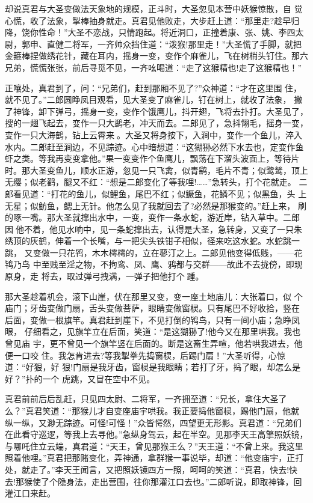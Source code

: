 却说真君与大圣变做法天象地的规模，正斗时，大圣忽见本营中妖猴惊散，自
觉心慌，收了法象，掣棒抽身就走。真君见他败走，大步赶上道：“那里走?趁早归
降，饶你性命！”大圣不恋战，只情跑起。将近洞口，正撞着康、张、姚、李四太
尉，郭申、直健二将军，一齐帅众挡住道：“泼猴!那里走！”大圣慌了手脚，就把
金箍棒捏做绣花针，藏在耳内，摇身一变，变作个麻雀儿，飞在树梢头钉住。那六
兄弟，慌慌张张，前后寻觅不见，一齐吆喝道：“走了这猴精也!走了这猴精也！”

正嚷处，真君到了，问：“兄弟们，赶到那厢不见了?”众神道：“才在这里围
住，就不见了。”二郎圆睁凤目观看，见大圣变了麻雀儿，钉在树上，就收了法象，
撇了神锋，卸下弹弓，摇身一变，变作个饿鹰儿，抖开翅，飞将去扑打。大圣见了，
搜的一翅飞起去，变作一只大鹚老，冲天而去。二郎见了，急抖翎毛，摇身一变，
变作一只大海鹤，钻上云霄来。大圣又将身按下，入涧中，变作一个鱼儿，淬入
水内。二郎赶至涧边，不见踪迹。心中暗想道：“这猢狲必然下水去也，定变作鱼
虾之类。等我再变变拿他。”果一变变作个鱼鹰儿，飘荡在下溜头波面上，等待片
时。那大圣变鱼儿，顺水正游，忽见一只飞禽，似青鹞，毛片不青；似鹭鸶，顶上
无缨；似老鹳，腿又不红：“想是二郎变化了等我哩!……”急转头，打个花就走。
二郎看见道：“打花的鱼儿，似鲤鱼，尾巴不红；似鳜鱼，花鳞不见；似黑鱼，头
上无星；似鲂鱼，鳃上无针。他怎么见了我就回去了?必然是那猴变的。”赶上来，
刷的啄一嘴。那大圣就撺出水中，一变，变作一条水蛇，游近岸，钻入草中。二郎
因他不着，他见水响中，见一条蛇撺出去，认得是大圣，急转身，又变了一只朱
绣顶的灰鹤，伸着一个长嘴，与一把尖头铁钳子相似，径来吃这水蛇。水蛇跳一跳，
又变做一只花鸨，木木樗樗的，立在蓼汀之上。二郎见他变得低贱，——花鸨乃鸟
中至贱至淫之物，不拘鸾、凤、鹰、鸦都与交群——故此不去拢傍，即现原身，走
将去，取过弹弓拽满，一弹子把他打个踵。

那大圣趁着机会，滚下山崖，伏在那里又变，变一座土地庙儿：大张着口，似
个庙门；牙齿变做门扇，舌头变做菩萨，眼睛变做窗棂。只有尾巴不好收拾，竖在
后面，变做一根旗竿。真君赶到崖下，不见打倒的鸨鸟，只有一间小庙；急睁凤眼，
仔细看之，见旗竿立在后面，笑道：“是这猢狲了!他今又在那里哄我。我也曾见庙
宇，更不曾见一个旗竿竖在后面的。断是这畜生弄喧，他若哄我进去，他便一口咬
住。我怎肯进去?等我掣拳先捣窗棂，后踢门扇！”大圣听得，心惊道：“好狠，好
狠!门扇是我牙齿，窗棂是我眼睛；若打了牙，捣了眼，却怎么是好？”扑的一个
虎跳，又冒在空中不见。

真君前前后后乱赶，只见四太尉、二将军，一齐拥至道：“兄长，拿住大圣了
么？”真君笑道：“那猴儿才自变座庙宇哄我。我正要捣他窗棂，踢他门扇，他就
纵一纵，又渺无踪迹。可怪!可怪！”众皆愕然，四望更无形影。真君道：“兄弟们
在此看守巡逻，等我上去寻他。”急纵身驾云，起在半空。见那李天王高擎照妖镜，
与哪吒住立云端，真君道：“天王，曾见那猴王么？”天王道：“不曾上来。我这里
照着他哩。”真君把那赌变化，弄神通，拿群猴一事说毕，却道：“他变庙宇，正打
处，就走了。”李天王闻言，又把照妖镜四方一照，呵呵的笑道：“真君，快去!快
去!那猴使了个隐身法，走出营围，往你那灌江口去也。”二郎听说，即取神锋，回
灌江口来赶。

